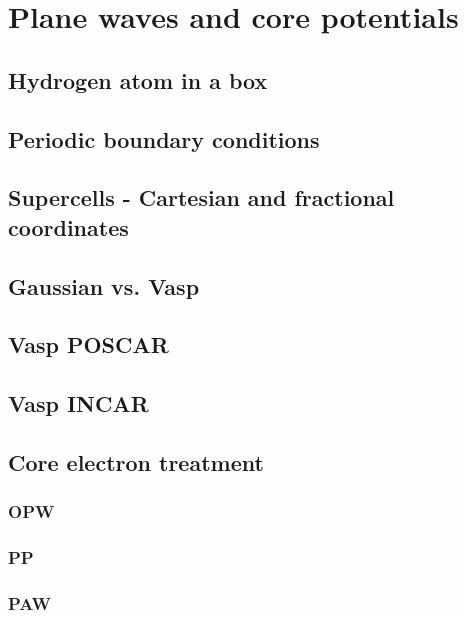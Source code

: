 \documentclass[11pt]{article}
\begin{document}
\section{Plane waves and core potentials}
\label{sec:orgdd8035f}

\subsection{Hydrogen atom in a box}
\label{sec:org8941291}

\subsection{Periodic boundary conditions}
\label{sec:org986067f}

\subsection{Supercells - Cartesian and fractional coordinates}
\label{sec:org3d47af7}

\subsection{Gaussian vs. Vasp}
\label{sec:org38ce5d9}

\subsection{Vasp POSCAR}
\label{sec:org3d847c9}

\subsection{Vasp INCAR}
\label{sec:orge3516b7}

\subsection{Core electron treatment}
\label{sec:orga537854}

\subsubsection{OPW}
\label{sec:orgcf214f0}

\subsubsection{PP}
\label{sec:org6f77bc5}

\subsubsection{PAW}
\label{sec:org5c808a8}
\end{document}
